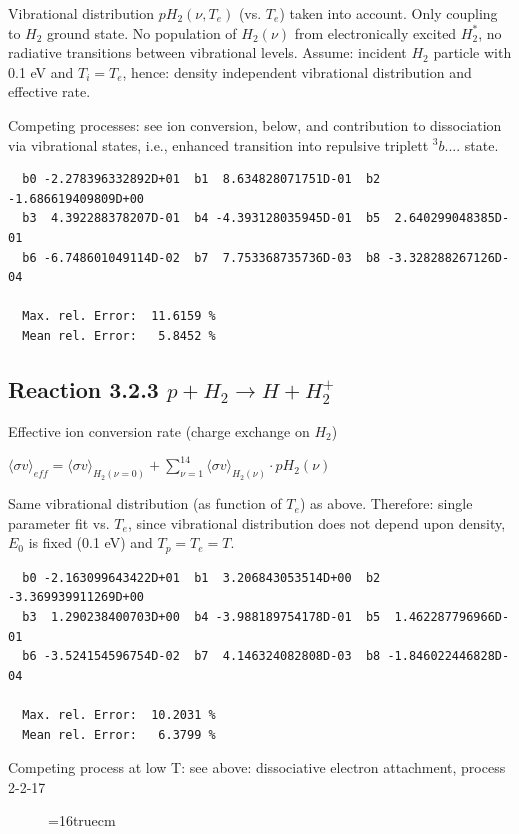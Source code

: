 \documentclass[12pt,dvips]{article}
\begin{document}
Vibrational distribution $pH_2(\nu,T_e)$ (vs. $T_e$) taken into
account. Only coupling
to $H_2$ ground state. No population of $H_2(\nu)$ from electronically
excited $H_2^*$, no radiative transitions between vibrational levels.
Assume: incident $H_2$ particle with 0.1 eV and $T_i = T_e$,
hence: density independent vibrational distribution and effective
rate.

Competing processes: see ion conversion, below, and contribution to
dissociation via vibrational states, i.e., enhanced transition into
repulsive triplett $^3b....$ state.

\begin{small}\begin{verbatim}
  b0 -2.278396332892D+01  b1  8.634828071751D-01  b2 -1.686619409809D+00
  b3  4.392288378207D-01  b4 -4.393128035945D-01  b5  2.640299048385D-01
  b6 -6.748601049114D-02  b7  7.753368735736D-03  b8 -3.328288267126D-04

  Max. rel. Error:  11.6159 %
  Mean rel. Error:   5.8452 %
\end{verbatim}\end{small}


\subsection{
Reaction 3.2.3   $p + H_2 \rightarrow H + H_2^+  $
}

  Effective ion conversion rate (charge exchange on $H_2$)

  $ \langle\sigma v \rangle_{eff} = \langle\sigma v \rangle_{H_2(\nu=0)} + \sum_{\nu=1}^{14}
\langle\sigma v \rangle_{H_2(\nu)} \cdot pH_2(\nu) $

  Same vibrational distribution (as function of $T_e$) as above.
  Therefore:
  single parameter fit vs. $T_e$,
  since vibrational distribution does not depend upon density, $E_0$ is fixed
  (0.1 eV) and $T_p = T_e = T$.

\begin{small}\begin{verbatim}
  b0 -2.163099643422D+01  b1  3.206843053514D+00  b2 -3.369939911269D+00
  b3  1.290238400703D+00  b4 -3.988189754178D-01  b5  1.462287796966D-01
  b6 -3.524154596754D-02  b7  4.146324082808D-03  b8 -1.846022446828D-04

  Max. rel. Error:  10.2031 %
  Mean rel. Error:   6.3799 %

\end{verbatim}\end{small}
Competing process at low T: see above: dissociative electron attachment, process 2-2-17
\begin{figure} \label{3.2.3}
\epsfxsize=16truecm
\end{figure}
\end{document}
